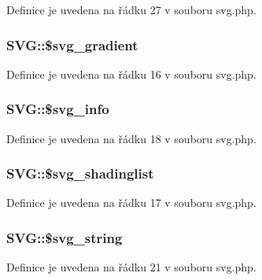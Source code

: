 Definice je uvedena na řádku 27 v souboru svg.\-php.

\hypertarget{class_s_v_g_a7af1d7443fbab8860431fd8faba87ede}{
\subsubsection[{\$svg\-\_\-gradient}]{\setlength{\rightskip}{0pt plus 5cm}S\-V\-G\-::\$svg\-\_\-gradient}}\label{class_s_v_g_a7af1d7443fbab8860431fd8faba87ede}


Definice je uvedena na řádku 16 v souboru svg.\-php.

\hypertarget{class_s_v_g_acf3e043686c33a3522d3a9977a7f276e}{
\subsubsection[{\$svg\-\_\-info}]{\setlength{\rightskip}{0pt plus 5cm}S\-V\-G\-::\$svg\-\_\-info}}\label{class_s_v_g_acf3e043686c33a3522d3a9977a7f276e}


Definice je uvedena na řádku 18 v souboru svg.\-php.

\hypertarget{class_s_v_g_a3a87e4c389b95e944d583a943e903260}{
\subsubsection[{\$svg\-\_\-shadinglist}]{\setlength{\rightskip}{0pt plus 5cm}S\-V\-G\-::\$svg\-\_\-shadinglist}}\label{class_s_v_g_a3a87e4c389b95e944d583a943e903260}


Definice je uvedena na řádku 17 v souboru svg.\-php.

\hypertarget{class_s_v_g_a8efc8627d939c38e431c20516b058431}{
\subsubsection[{\$svg\-\_\-string}]{\setlength{\rightskip}{0pt plus 5cm}S\-V\-G\-::\$svg\-\_\-string}}\label{class_s_v_g_a8efc8627d939c38e431c20516b058431}


Definice je uvedena na řádku 21 v souboru svg.\-php.

